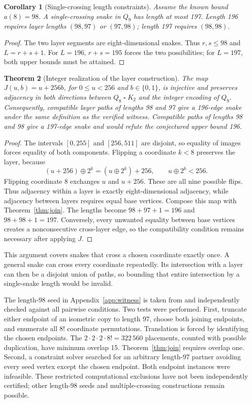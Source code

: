 \documentclass[11pt,a4paper]{article}
\newtheorem{theorem}{Theorem}[section]
\newtheorem{corollary}[theorem]{Corollary}
\theoremstyle{definition}
\theoremstyle{remark}
\newcommand{\Q}{Q}
\begin{document}
\begin{corollary}[Single-crossing length constraints]
Assume the known bound $a(8)=98$. A single-crossing snake in $\Q_9$ has length at most 197. Length 196 requires layer lengths $(98,97)$ or $(97,98)$; length 197 requires $(98,98)$.
\end{corollary}
\begin{proof}
The two layer segments are eight-dimensional snakes. Thus $r,s\le98$ and $L=r+s+1$. For $L=196$, $r+s=195$ forces the two possibilities; for $L=197$, both upper bounds must be attained.
\end{proof}
\begin{theorem}[Integer realization of the layer construction]
The map $J(u,b)=u+256b$, for $0\le u<256$ and $b\in\{0,1\}$, is injective and preserves adjacency in both directions between $\Q_8\mathbin{\square}K_2$ and the integer encoding of $\Q_9$. Consequently, compatible layer paths of lengths 98 and 97 give a 196-edge snake under the same definition as the verified witness. Compatible paths of lengths 98 and 98 give a 197-edge snake and would refute the conjectured upper bound 196.
\end{theorem}
\begin{proof}
The intervals $[0,255]$ and $[256,511]$ are disjoint, so equality of images forces equality of both components. Flipping a coordinate $k<8$ preserves the layer, because
\[
(u+256)\mathbin{\oplus}2^k=(u\mathbin{\oplus}2^k)+256,
\qquad u\mathbin{\oplus}2^k<256.
\]
Flipping coordinate 8 exchanges $u$ and $u+256$. These are all nine possible flips. Thus adjacency within a layer is exactly eight-dimensional adjacency, while adjacency between layers requires equal base vertices. Compose this map with Theorem~\ref{thm:join}. The lengths become $98+97+1=196$ and $98+98+1=197$. Conversely, every unwanted equality between base vertices creates a nonconsecutive cross-layer edge, so the compatibility condition remains necessary after applying $J$.
\end{proof}
This argument covers snakes that cross a chosen coordinate exactly once. A general snake can cross every coordinate repeatedly. Its intersection with a layer can then be a disjoint union of paths, so bounding that entire intersection by a single-snake length would be invalid.

The length-98 seed in Appendix~\ref{app:witness} is taken from \cite{records} and independently checked against all pairwise conditions. Two tests were performed. First, truncate either endpoint of an isometric copy to length 97, choose both joining endpoints, and enumerate all $8!$ coordinate permutations. Translation is forced by identifying the chosen endpoints. The $2\cdot2\cdot2\cdot8!=322\,560$ placements, counted with possible duplication, have minimum overlap 15. Theorem~\ref{thm:join} requires overlap one. Second, a constraint solver searched for an arbitrary length-97 partner avoiding every seed vertex except the chosen endpoint. Both endpoint instances were infeasible. These restricted computational exclusions have not been independently certified; other length-98 seeds and multiple-crossing constructions remain possible.
\end{document}
